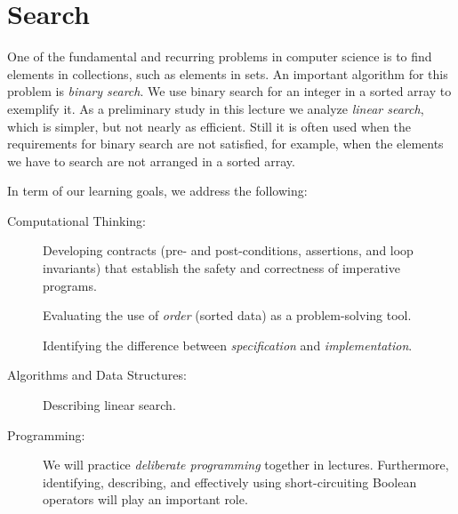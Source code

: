 \chapter{Search}
\label{ch:linsearch}

\newcommand{\lecnum}{4}
\newcommand{\lecturer}{Frank Pfenning}

\maketitle

\begin{preamble}
One of the fundamental and recurring problems in computer science is
to find elements in collections, such as elements in sets.  An
important algorithm for this problem is \emph{binary search}.  We use
binary search for an integer in a sorted array to exemplify it.  As a
preliminary study in this lecture we analyze \emph{linear search},
which is simpler, but not nearly as efficient.  Still it is often used
when the requirements for binary search are not satisfied, for
example, when the elements we have to search are not arranged in a
sorted array.
\end{preamble}


\begin{gram}
In term of our learning goals, we address the following:
\begin{description}
\item[Computational Thinking:] %
  Developing contracts (pre- and post-conditions, assertions, and loop
  invariants) that establish the safety and correctness of imperative
  programs.

  Evaluating the use of \emph{order}
  (sorted data) as a problem-solving tool.

  Identifying the difference between \emph{specification} and
  \emph{implementation}.

\item[Algorithms and Data Structures:] %
  Describing linear search.

\item[Programming:] %
  We will practice \emph{deliberate programming} together in lectures.
  Furthermore, identifying, describing, and effectively using
  short-circuiting Boolean operators will play an important role.

\end{description}
\end{gram}

